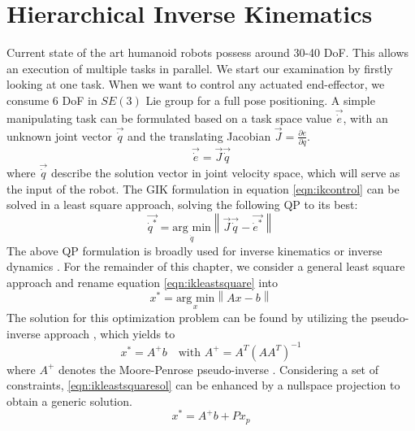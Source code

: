 \section{Hierarchical Inverse Kinematics}
Current state of the art humanoid robots possess around 30-40 DoF. This allows an execution of multiple tasks in parallel. We start our examination by firstly looking at one task. When we want to control any actuated end-effector, we consume 6 DoF in $SE(3)$ Lie group \cite{LIE} for a full pose positioning. A simple manipulating task can be formulated based on a task space value $\vec{\dot{e}}$, with an unknown joint vector $\vec{\dot{q}}$ and the translating Jacobian $\vec{J}= \frac{\partial e}{\partial q}$.
\begin{equation}\label{eqn:ikcontrol}
\vec{\dot{e}} = \vec{J}\vec{\dot{q}}
\end{equation}
where $\vec{\dot{q}}$ describe the solution vector in joint velocity space, which will serve as the input of the robot.
The GIK formulation in equation \ref{eqn:ikcontrol} can be solved in a least square approach, solving the following QP to its best:
\begin{equation}\label{eqn:ikleastsquare}
\vec{\dot{q}^*} =  \underset{\dot{q}}{\text{arg min}} \left\| \vec{J}\vec{\dot{q}} - \vec{\dot{e}^*} \right \|
\end{equation}
The above QP formulation is broadly used for inverse kinematics \cite{Whitney72a}\cite{Chiaverini94reviewof} or inverse dynamics \cite{khatib-1987a}. For the remainder of this chapter, we consider a general least square approach and rename equation \ref{eqn:ikleastsquare} into
\begin{equation}\label{eqn:ikleastsquaresol}
x^* =  \underset{x}{\text{arg min}} \left\| Ax - b \right \|
\end{equation}
The solution for this optimization problem can be found by utilizing the pseudo-inverse approach \cite{journals/jirs/Siciliano90}, which yields to
\begin{equation}\label{eqn:ikleastsquaresolinv}
x^* = A^+ b \quad \text{with }A^+ = A^T(AA^T)^{-1}
\end{equation}
where $A^+$ denotes the Moore-Penrose pseudo-inverse \cite{ben2003generalized}. Considering a set of constraints, \ref{eqn:ikleastsquaresol} can be enhanced by a nullspace projection \cite{Liegeois1977} to obtain a generic solution.
\begin{equation}\label{eqn:ikleastsquarenullspace}
x^* = A^+ b  + Px_p
\end{equation}
